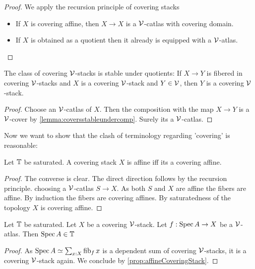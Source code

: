 \documentclass{article}
\begin{document}
\begin{proof}
We apply the recursion principle of covering stacks 
	\begin{itemize}
		\item If 	$X$ is covering affine, then $X \to X$ is a $\mathcal{V}$-catlas with covering domain. \\
\item If $X$ is obtained as a quotient then it already is equipped with a $\mathcal{V}$-atlas. %

	\end{itemize}
\end{proof}
\begin{prop}
	The class of covering $\mathcal{V}$-stacks is stable under quotients: If $X \to Y$ is fibered in covering $\mathcal{V}$-stacks and $X$ is a covering $\mathcal{V}$-stack and $Y \in \mathcal{V}$, then $Y$ is a covering $\mathcal{V}$-stack.
\end{prop}
\begin{proof}
	Choose an $\mathcal{V}$-catlas of $X$. Then the composition with the map $X \to Y$ is a $\mathcal{V}$-cover by \ref{lemma:coversstableundercomp}. Surely its a $\mathcal{V}$-catlas.
\end{proof}
Now we want to show that the clash of terminology regarding 'covering' is reasonable:


\begin{prop}{\label{prop:affineCoveringStack}}
	Let $\mathbb{T}$ be saturated.
	A covering stack $X$ is affine iff its a covering affine.
\end{prop}
\begin{proof}
	The converse is clear. The direct direction follows by the recursion principle. choosing a $\mathcal{V}$-catlas  $S \to X$. As both $S$ and $X$ are affine the fibers are affine. By induction the fibers are covering affines. By saturatedness of the topology $X$ is covering affine.
\end{proof}
\begin{lemma}{\label{lemma:atlasIsCatlas}}
		Let $\mathbb{T}$ be saturated. Let $X$ be a covering $\mathcal{V}$-stack. Let $f : \operatorname{Spec} A \to X$ be a $\mathcal{V}$-atlas. Then $\operatorname{Spec} A \in \mathbb{T}$
\end{lemma}
\begin{proof}
	As $\operatorname{Spec} A \simeq \sum_{x : X} \operatorname{fib}_f x$ is a dependent sum of covering $\mathcal{V}$-stacks, it is a covering $\mathcal{V}$-stack again. We conclude by \ref{prop:affineCoveringStack}.
\end{proof}	
\end{document}
